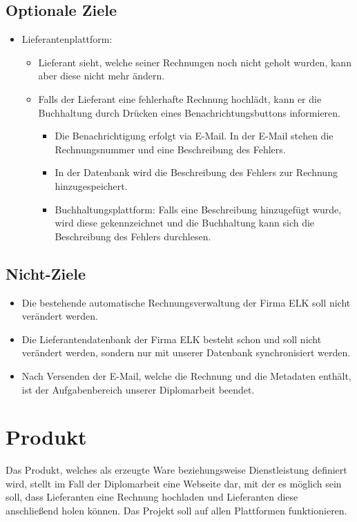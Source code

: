 \subsection{Optionale Ziele}
\begin{itemize}
\item Lieferantenplattform: 

\begin{itemize}
\item Lieferant sieht, welche seiner Rechnungen noch nicht geholt wurden,
kann aber diese nicht mehr ändern. 
\item Falls der Lieferant eine fehlerhafte Rechnung hochlädt, kann er die
Buchhaltung durch Drücken eines Benachrichtungsbuttons informieren. 

\begin{itemize}
\item Die Benachrichtigung erfolgt via E-Mail. In der E-Mail stehen die
Rechnungsnummer und eine Beschreibung des Fehlers. 
\item In der Datenbank wird die Beschreibung des Fehlers zur Rechnung hinzugespeichert. 
\item Buchhaltungsplattform: Falls eine Beschreibung hinzugefügt wurde,
wird diese gekennzeichnet und die Buchhaltung kann sich die Beschreibung
des Fehlers durchlesen.
\end{itemize}
\end{itemize}
\end{itemize}

\subsection{Nicht-Ziele}
\begin{itemize}
\item Die bestehende automatische Rechnungsverwaltung der Firma ELK soll
nicht verändert werden. 
\item Die Lieferantendatenbank der Firma ELK besteht schon und soll nicht
verändert werden, sondern nur mit unserer Datenbank synchronisiert
werden. 
\item Nach Versenden der E-Mail, welche die Rechnung und die Metadaten enthält,
ist der Aufgabenbereich unserer Diplomarbeit beendet. 
\end{itemize}


\section{Produkt}
Das Produkt, welches als erzeugte Ware beziehungsweise Dienstleistung definiert wird, stellt im Fall der Diplomarbeit eine Webseite dar, mit der es möglich sein soll, dass Lieferanten eine Rechnung hochladen und Lieferanten diese anschließend holen können. Das Projekt soll auf allen Plattformen funktionieren.


